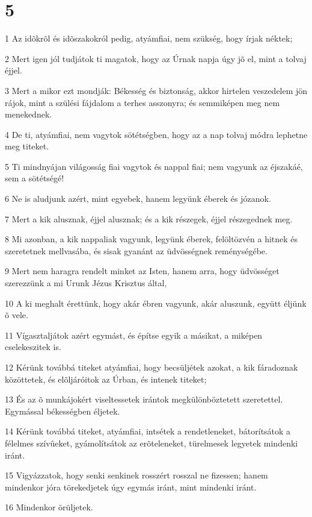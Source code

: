 \chapter{5}

\par 1 Az idõkrõl és idõszakokról pedig, atyámfiai, nem szükség, hogy írjak néktek;
\par 2 Mert igen jól tudjátok ti magatok, hogy az Úrnak napja úgy jõ el, mint a tolvaj éjjel.
\par 3 Mert a mikor ezt mondják: Békesség és biztonság, akkor hirtelen veszedelem jön rájok, mint a szülési fájdalom a terhes asszonyra; és semmiképen meg nem menekednek.
\par 4 De ti, atyámfiai, nem vagytok sötétségben, hogy az a nap tolvaj módra lephetne meg titeket.
\par 5 Ti mindnyájan világosság fiai vagytok és nappal fiai; nem vagyunk az éjszakáé, sem a sötétségé!
\par 6 Ne is aludjunk azért, mint egyebek, hanem legyünk éberek és józanok.
\par 7 Mert a kik alusznak, éjjel alusznak; és a kik részegek, éjjel részegednek meg.
\par 8 Mi azonban, a kik nappaliak vagyunk, legyünk éberek, felöltözvén a hitnek és szeretetnek mellvasába, és sisak gyanánt az üdvösségnek reménységébe.
\par 9 Mert nem haragra rendelt minket az Isten, hanem arra, hogy üdvösséget szerezzünk a mi Urunk Jézus Krisztus által,
\par 10 A ki meghalt érettünk, hogy akár ébren vagyunk, akár aluszunk, együtt éljünk õ vele.
\par 11 Vígasztaljátok azért egymást, és építse egyik a másikat, a miképen cselekeszitek is.
\par 12 Kérünk továbbá titeket atyámfiai, hogy becsüljétek azokat, a kik fáradoznak közöttetek, és elõljáróitok az Úrban, és intenek titeket;
\par 13 És az õ munkájokért viseltessetek irántok megkülönböztetett szeretettel. Egymással békességben éljetek.
\par 14 Kérünk továbbá titeket, atyámfiai, intsétek a rendetleneket, bátorítsátok a félelmes szívûeket, gyámolítsátok az erõteleneket, türelmesek legyetek mindenki iránt.
\par 15 Vigyázzatok, hogy senki senkinek rosszért rosszal ne fizessen; hanem mindenkor jóra törekedjetek úgy egymás iránt, mint mindenki iránt.
\par 16 Mindenkor örüljetek.
